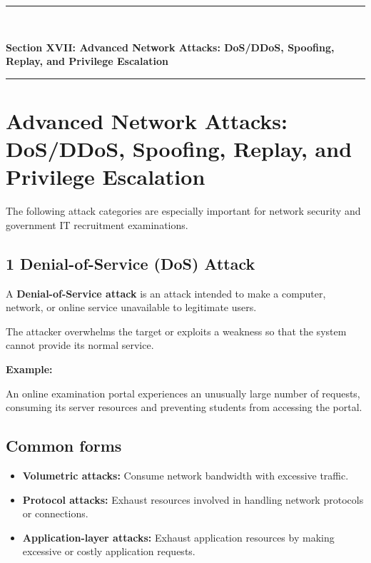 \newpage
\begin{center}
\vspace{0.5em}
{\color{primary}\rule{0.45\textwidth}{1.2pt}\\[4pt]}
{\Large\bfseries\color{primary} Section XVII: Advanced Network Attacks: DoS/DDoS, Spoofing, Replay, and Privilege Escalation\\[2pt]}
{\color{primary}\rule{0.45\textwidth}{1.2pt}}
\vspace{0.5em}
\end{center}

\section{Advanced Network Attacks: DoS/DDoS, Spoofing, Replay, and Privilege Escalation}


The following attack categories are especially important for network security and government IT recruitment examinations.

\subsection{1 Denial-of-Service (DoS) Attack}

A \textbf{Denial-of-Service attack} is an attack intended to make a computer, network, or online service unavailable to legitimate users.

The attacker overwhelms the target or exploits a weakness so that the system cannot provide its normal service.

\textbf{Example:}

An online examination portal experiences an unusually large number of requests, consuming its server resources and preventing students from accessing the portal.

\subsection{Common forms}

\begin{itemize}
\item \textbf{Volumetric attacks:} Consume network bandwidth with excessive traffic.
\item \textbf{Protocol attacks:} Exhaust resources involved in handling network protocols or connections.
\item \textbf{Application-layer attacks:} Exhaust application resources by making excessive or costly application requests.
\end{itemize}

